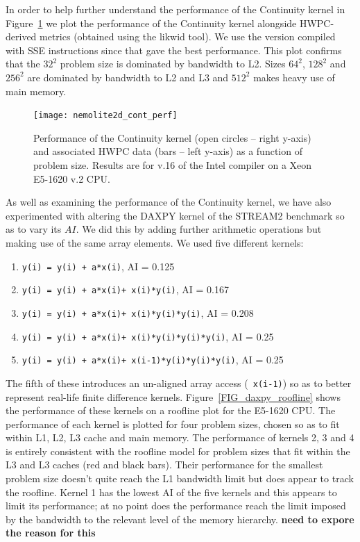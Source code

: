 \documentclass[12pt]{article}
\begin{document}
In order to help further understand the performance of the Continuity
kernel in Figure~\ref{FIG_cont_perf} we plot the performance of the
Continuity kernel alongside HWPC-derived metrics (obtained using the
likwid tool). We use the version compiled with SSE instructions since
that gave the best performance. This plot confirms that the $32^2$
problem size is dominated by bandwidth to L2. Sizes $64^2$, $128^2$
and $256^2$ are dominated by bandwidth to L2 and L3 and $512^2$ makes
heavy use of main memory.

\begin{figure}
  \centering
  \texttt{[image: nemolite2d\_cont\_perf]}
  \caption{Performance of the Continuity kernel (open circles -- right y-axis)
    and associated HWPC data (bars -- left y-axis) as a function of
    problem size. Results are for v.16 of the Intel compiler on a Xeon
    E5-1620 v.2 CPU.}
  \label{FIG_cont_perf}
\end{figure}

As well as examining the performance of the Continuity kernel, we have
also experimented with altering the DAXPY kernel of the STREAM2
benchmark so as to vary its $AI$. We did this by adding further
arithmetic operations but making use of the same array
elements. We used five different kernels:
\begin{enumerate}
\item {\tt y(i) = y(i) + a*x(i)}, AI = 0.125
\item {\tt y(i) = y(i) + a*x(i)+ x(i)*y(i)}, AI = 0.167
\item {\tt y(i) = y(i) + a*x(i)+ x(i)*y(i)*y(i)}, AI = 0.208
\item {\tt y(i) = y(i) + a*x(i)+ x(i)*y(i)*y(i)*y(i)}, AI = 0.25
\item {\tt y(i) = y(i) + a*x(i)+ x(i-1)*y(i)*y(i)*y(i)}, AI = 0.25
\end{enumerate}
The fifth of these introduces an un-aligned array access ({\tt
  x(i-1)}) so as to better represent real-life finite difference
kernels.  Figure~\ref{FIG_daxpy_roofline} shows the performance of
these kernels on a roofline plot for the E5-1620 CPU. The performance
of each kernel is plotted for four problem sizes, chosen so as to fit
within L1, L2, L3 cache and main memory. The performance of kernels 2,
3 and 4 is entirely consistent with the roofline model for problem
sizes that fit within the L3 and L3 caches (red and black bars). Their
performance for the smallest problem size doesn't quite reach the L1
bandwidth limit but does appear to track the roofline.  Kernel 1 has
the lowest AI of the five kernels and this appears to limit its
performance; at no point does the performance reach the limit imposed
by the bandwidth to the relevant level of the memory hierarchy. {\bf need to expore the reason for this}
\end{document}
